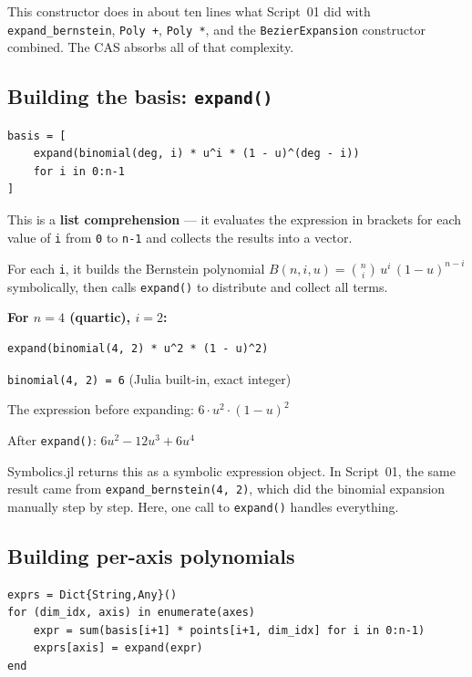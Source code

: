 \documentclass[12pt, a4paper]{article}
\newcommand{\cd}[1]{\texttt{#1}}
\begin{document}
This constructor does in about ten lines what Script~01 did
with \cd{expand\_bernstein}, \cd{Poly +}, \cd{Poly *}, and the
\cd{BezierExpansion} constructor combined.
The CAS absorbs all of that complexity.

\subsection{Building the basis: \texttt{expand()}}

\begin{verbatim}
basis = [
    expand(binomial(deg, i) * u^i * (1 - u)^(deg - i))
    for i in 0:n-1
]
\end{verbatim}

This is a \textbf{list comprehension} --- it evaluates the
expression in brackets for each value of \cd{i} from \cd{0}
to \cd{n-1} and collects the results into a vector.

For each \cd{i}, it builds the Bernstein polynomial
$B(n, i, u) = \binom{n}{i}\,u^i\,(1-u)^{n-i}$ symbolically,
then calls \cd{expand()} to distribute and collect all terms.

\begin{examplebox}
\textbf{For $n=4$ (quartic), $i=2$:}

\begin{verbatim}
expand(binomial(4, 2) * u^2 * (1 - u)^2)
\end{verbatim}

\cd{binomial(4, 2) = 6} (Julia built-in, exact integer)

The expression before expanding: $6 \cdot u^2 \cdot (1-u)^2$

After \cd{expand()}: $6u^2 - 12u^3 + 6u^4$

Symbolics.jl returns this as a symbolic expression object.
In Script~01, the same result came from \cd{expand\_bernstein(4, 2)},
which did the binomial expansion manually step by step.
Here, one call to \cd{expand()} handles everything.
\end{examplebox}

\subsection{Building per-axis polynomials}

\begin{verbatim}
exprs = Dict{String,Any}()
for (dim_idx, axis) in enumerate(axes)
    expr = sum(basis[i+1] * points[i+1, dim_idx] for i in 0:n-1)
    exprs[axis] = expand(expr)
end
\end{verbatim}
\end{document}
